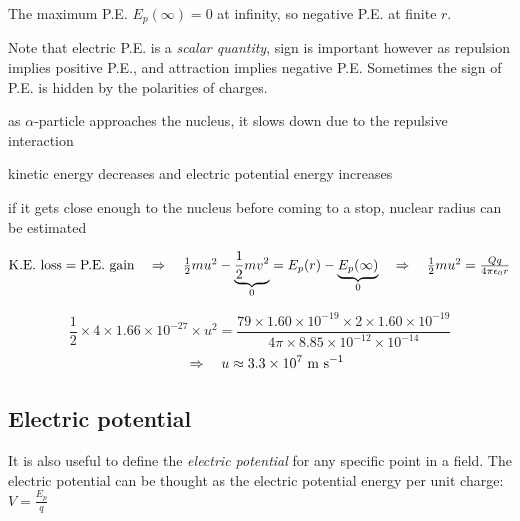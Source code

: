 The maximum P.E. $E_p(\infty)=0$ at infinity, so negative P.E. at finite $r$.

Note that electric P.E. is a \emph{scalar quantity}, sign is important however as repulsion implies positive P.E., and attraction implies negative P.E. Sometimes the sign of P.E. is hidden by the polarities of charges.


	
\begin{soln} as $\alpha$-particle approaches the nucleus, it slows down due to the repulsive interaction

kinetic energy decreases and electric potential energy increases

if it gets close enough to the nucleus before coming to a stop, nuclear radius can be estimated

{

\centering

$\text{K.E. loss} = \text{P.E. gain} \quad \Rightarrow \quad \frac{1}{2}mu^2 - \underbrace{\frac{1}{2}mv^2}_0 = E_p(r) - \underbrace{E_p(\infty)}_0 \quad \Rightarrow \quad  \frac{1}{2}mu^2= \frac{Qq}{4\pi\epsilon_0r}$

}

\begin{equation*}
	\frac{1}{2}\times4\times1.66\times10^{-27}\times u^2 = \frac{79\times1.60\times10^{-19}\times2\times1.60\times10^{-19}}{4\pi\times8.85\times10^{-12}\times10^{-14}} \end{equation*}
 \begin{equation*} 
 \quad \Rightarrow \quad	u\approx 3.3\times10^7\text{ m s$^{-1}$} 
\end{equation*}
\end{soln}




\subsection{Electric potential}

It is also useful to define the \emph{electric potential} for any specific point in a field. The electric potential can be thought as the electric potential energy per unit charge: $V = \frac{E_p}{q}$

